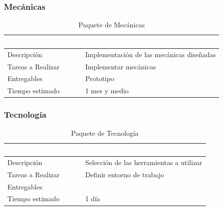 \subsubsection{Mecánicas}
\begin{table}[h!]
    \centering
    \begin{tabular}{|l|p{10cm}|}
        \hline
        \rowcolor{Red}
        \textcolor{white}{\textbf{Nombre del Paquete}} & \textcolor{white}{\textbf{Mecánicas}}\\
        \hline
        \rowcolor{Light Red}
        Descripción & Implementación de las mecánicas diseñadas\\
        \hline
        \rowcolor{Light Red}
        Tareas a Realizar & Implementar mecánicas\\
        \hline
        \rowcolor{Light Red}
        Entregables & Prototipo\\
        \hline
        \rowcolor{Light Red}
        Tiempo estimado & 1 mes y medio\\
        \hline
    \end{tabular}
    \caption{Paquete de Mecánicas}
    \label{tab:paquete-mecanicas}
\end{table}

\newpage
\subsubsection{Tecnología}
\begin{table}[h!]
    \centering
    \begin{tabular}{|l|p{10cm}|}
        \hline
        \rowcolor{Yellow}
        \textcolor{white}{\textbf{Nombre del Paquete}} & \textcolor{white}{\textbf{Tecnología}}\\
        \hline
        \rowcolor{Light Yellow}
        Descripción & Selección de las herramientas a utilizar\\
        \hline
        \rowcolor{Light Yellow}
        Tareas a Realizar & Definir entorno de trabajo\\
        \hline
        \rowcolor{Light Yellow}
        Entregables & \\
        \hline
        \rowcolor{Light Yellow}
        Tiempo estimado & 1 día\\
        \hline
    \end{tabular}
    \caption{Paquete de Tecnología}
    \label{tab:paquete-tecnologia}
\end{table}

